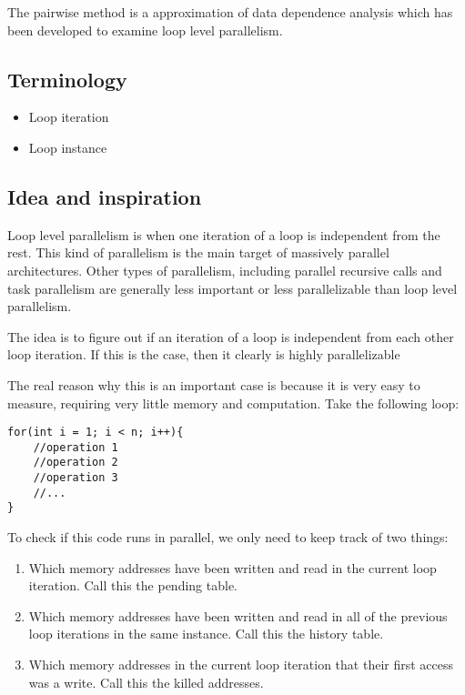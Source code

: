 \documentclass[12pt,twoside]{reedthesis}
\begin{document}
		The pairwise method is a approximation of data dependence analysis which has been developed to examine loop level parallelism.

		\subsection{Terminology}
		\begin{itemize}
			\item Loop iteration
			\item Loop instance
		\end{itemize}

		\subsection{Idea and inspiration}

		Loop level parallelism is when one iteration of a loop is independent from the rest. This kind of parallelism is the main target of massively parallel architectures. Other types of parallelism, including parallel recursive calls and task parallelism are generally less important or less parallelizable than loop level parallelism.

		The idea is to figure out if an iteration of a loop is independent from each other loop iteration. If this is the case, then it clearly is highly parallelizable

		The real reason why this is an important case is because it is very easy to measure, requiring very little memory and computation. Take the following loop:
\begin{lstlisting}
for(int i = 1; i < n; i++){
	//operation 1
	//operation 2
	//operation 3
	//...
}
\end{lstlisting}


		To check if this code runs in parallel, we only need to keep track of two things:

		\begin{enumerate}
			\item Which memory addresses have been written and read in the current loop iteration. Call this the pending table.
			\item Which memory addresses have been written and read in all of the previous loop iterations in the same instance. Call this the history table.
			\item Which memory addresses in the current loop iteration that their first access was a write. Call this the killed addresses.
		\end{enumerate}
\end{document}
